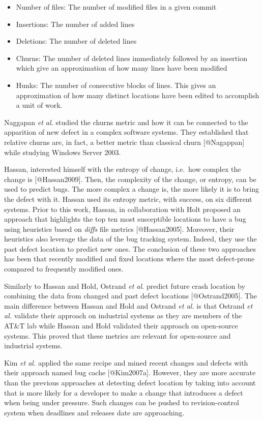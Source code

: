\begin{itemize}
\item
  Number of files: The number of modified files in a given commit
\item
  Insertions: The number of added lines
\item
  Deletions: The number of deleted lines
\item
  Churns: The number of deleted lines immediately followed by an
  insertion which give an approximation of how many lines have been
  modified
\item
  Hunks: The number of consecutive blocks of lines. This gives an
  approximation of how many distinct locations have been edited to
  accomplish a unit of work.
\end{itemize}

Naggapan \emph{et al.} studied the churns metric and how it can be
connected to the apparition of new defect in a complex software systems.
They established that relative churns are, in fact, a better metric than
classical churn {[}@Nagappan{]} while studying Windows Server 2003.

Hassan, interested himself with the entropy of change, i.e.~how complex
the change is {[}@Hassan2009{]}. Then, the complexity of the change, or
entropy, can be used to predict bugs. The more complex a change is, the
more likely it is to bring the defect with it. Hassan used its entropy
metric, with success, on six different systems. Prior to this work,
Hassan, in collaboration with Holt proposed an approach that highlights
the top ten most susceptible locations to have a bug using heuristics
based on \emph{diffs} file metrics {[}@Hassan2005{]}. Moreover, their
heuristics also leverage the data of the bug tracking system. Indeed,
they use the past defect location to predict new ones. The conclusion of
these two approaches has been that recently modified and fixed locations
where the most defect-prone compared to frequently modified ones.

Similarly to Hassan and Hold, Ostrand \emph{et al.} predict future crash
location by combining the data from changed and past defect locations
{[}@Ostrand2005{]}. The main difference between Hassan and Hold and
Ostrand \emph{et al.} is that Ostrand \emph{et al.} validate their
approach on industrial systems as they are members of the AT\&T lab
while Hassan and Hold validated their approach on open-source systems.
This proved that these metrics are relevant for open-source and
industrial systems.

Kim \emph{et al.} applied the same recipe and mined recent changes and
defects with their approach named bug cache {[}@Kim2007a{]}. However,
they are more accurate than the previous approaches at detecting defect
location by taking into account that is more likely for a developer to
make a change that introduces a defect when being under pressure. Such
changes can be pushed to revision-control system when deadlines and
releases date are approaching.


